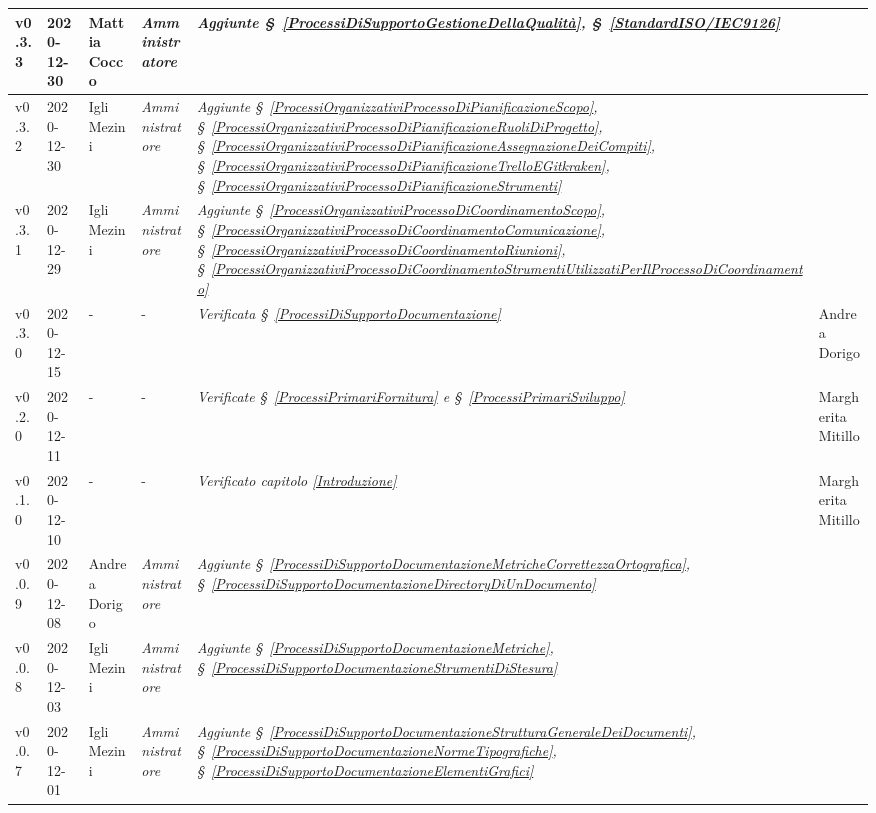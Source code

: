 {\begin{center}
\begin{longtable}[c]{|p{2cm-1\tabcolsep}|p{2cm}|p{3cm-2\tabcolsep}|p{3cm-1.5\tabcolsep}|p{}|p{3cm-2\tabcolsep}|}
		\hline
		\centering v0.3.3 & 2020-12-30 & Mattia Cocco & \centering \textit{Amministratore}  & \textit{Aggiunte  \S~\ref{ProcessiDiSupportoGestioneDellaQualità}, \S~\ref{StandardISO/IEC9126} }  & \makecell[c]{-}\\
		\hline
		\centering v0.3.2 & 2020-12-30 & Igli Mezini & \centering \textit{Amministratore}  & \textit{Aggiunte  \S~\ref{ProcessiOrganizzativiProcessoDiPianificazioneScopo}, \S~\ref{ProcessiOrganizzativiProcessoDiPianificazioneRuoliDiProgetto}, \S~\ref{ProcessiOrganizzativiProcessoDiPianificazioneAssegnazioneDeiCompiti}, \S~\ref{ProcessiOrganizzativiProcessoDiPianificazioneTrelloEGitkraken}, \S~\ref{ProcessiOrganizzativiProcessoDiPianificazioneStrumenti} } & \makecell[c]{-} \\
		\hline
		\centering v0.3.1 & 2020-12-29 & Igli Mezini & \centering \textit{Amministratore} &  \textit{Aggiunte  \S~\ref{ProcessiOrganizzativiProcessoDiCoordinamentoScopo}, \S~\ref{ProcessiOrganizzativiProcessoDiCoordinamentoComunicazione}, \S~\ref{ProcessiOrganizzativiProcessoDiCoordinamentoRiunioni}, \S~\ref{ProcessiOrganizzativiProcessoDiCoordinamentoStrumentiUtilizzatiPerIlProcessoDiCoordinamento} } & \makecell[c]{-} \\
		\hline
		\centering v0.3.0 & 2020-12-15 & \centering - & \centering -  & 
		\textit{Verificata  \S~\ref{ProcessiDiSupportoDocumentazione}} & Andrea Dorigo \\
		\hline
		\centering v0.2.0 & 2020-12-11 & \centering - & \centering -  & \textit{Verificate \S~\ref{ProcessiPrimariFornitura} e \S~\ref{ProcessiPrimariSviluppo} } & Margherita Mitillo \\
		\hline
		\centering v0.1.0 & 2020-12-10 & \centering - & \centering - & \textit{Verificato capitolo \ref{Introduzione}} & Margherita Mitillo  \\
		\hline
		\centering v0.0.9 & 2020-12-08 & Andrea Dorigo & \centering \textit{Amministratore} & \textit{Aggiunte  \S~\ref{ProcessiDiSupportoDocumentazioneMetricheCorrettezzaOrtografica}, \S~\ref{ProcessiDiSupportoDocumentazioneDirectoryDiUnDocumento}} & \makecell[c]{-}\\
		\hline
		\centering v0.0.8 & 2020-12-03 & Igli Mezini & \centering \textit{Amministratore} &  \textit{Aggiunte  \S~\ref{ProcessiDiSupportoDocumentazioneMetriche}, \S~\ref{ProcessiDiSupportoDocumentazioneStrumentiDiStesura}}&  \makecell[c]{-}\\
		\hline
		\centering v0.0.7 & 2020-12-01 & Igli Mezini & \centering \textit{Amministratore} &  \textit{Aggiunte  \S~\ref{ProcessiDiSupportoDocumentazioneStrutturaGeneraleDeiDocumenti}, \S~\ref{ProcessiDiSupportoDocumentazioneNormeTipografiche}, \S~\ref{ProcessiDiSupportoDocumentazioneElementiGrafici}} & \makecell[c]{-} \\

\end{longtable}
\end{center}}
